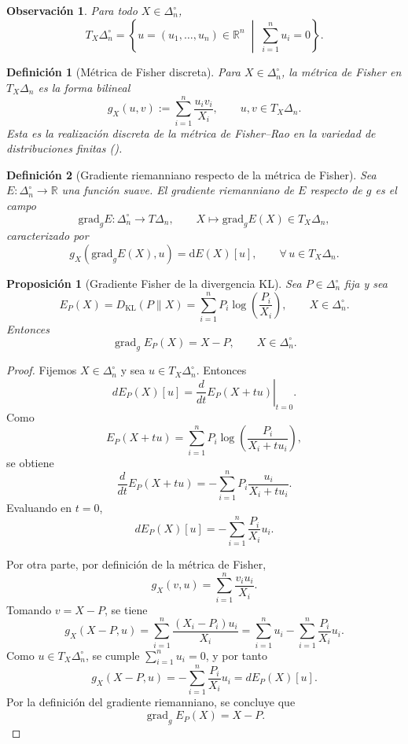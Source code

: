 \documentclass[12pt]{article}
\newtheorem{definicion}{Definición}[section]
\newtheorem{proposicion}{Proposición}[section]
\newtheorem{observacion}{Observación}[section]
\begin{document}
\begin{observacion}
Para todo $X\in\Delta_n^\circ$,
\[
T_X\Delta_n^\circ
=
\left\{
u=(u_1,\dots,u_n)\in\mathbb R^n
\;\middle|\;
\sum_{i=1}^n u_i=0
\right\}.
\]
\end{observacion}

\begin{definicion}[Métrica de Fisher discreta]\label{def:Fisher}
Para $X\in\Delta_n^\circ$, la \emph{métrica de Fisher} en $T_X\Delta_n$ es la forma bilineal
\[
g_X(u,v)
:=
\sum_{i=1}^n \frac{u_i v_i}{X_i},
\qquad
u,v\in T_X\Delta_n.
\]
Esta es la realización discreta de la métrica de Fisher--Rao en la variedad de distribuciones finitas (\cite{Chentsov1982,AmariNagaoka2000,Amari2016}).
\end{definicion}

\begin{definicion}[Gradiente riemanniano respecto de la métrica de Fisher]\label{def:gradienteFisher}
Sea $E:\Delta_n^\circ\to\mathbb R$ una función suave. El \emph{gradiente riemanniano} de $E$ respecto de $g$ es el campo
\[
\mathrm{grad}_gE:\Delta_n^\circ\to T\Delta_n,
\qquad
X\mapsto \mathrm{grad}_gE(X)\in T_X\Delta_n,
\]
caracterizado por
\[
g_X(\mathrm{grad}_gE(X),u)=\mathrm dE(X)[u],
\qquad
\forall\,u\in T_X\Delta_n.
\]
\end{definicion}
\begin{proposicion}[Gradiente Fisher de la divergencia KL]\label{prop:gradKL}
Sea $P\in\Delta_n^\circ$ fija y sea
\[
E_P(X)=D_{\mathrm{KL}}(P\|X)=\sum_{i=1}^n P_i \log\!\left(\frac{P_i}{X_i}\right),
\qquad X\in\Delta_n^\circ.
\]
Entonces
\[
\operatorname{grad}_g E_P(X)=X-P,
\qquad X\in\Delta_n^\circ.
\]
\end{proposicion}

\begin{proof}
Fijemos $X\in\Delta_n^\circ$ y sea $u\in T_X\Delta_n^\circ$. Entonces
\[
dE_P(X)[u]
=
\left.\frac{d}{dt}E_P(X+tu)\right|_{t=0}.
\]
Como
\[
E_P(X+tu)
=
\sum_{i=1}^n P_i \log\!\left(\frac{P_i}{X_i+tu_i}\right),
\]
se obtiene
\[
\frac{d}{dt}E_P(X+tu)
=
-\sum_{i=1}^n P_i \frac{u_i}{X_i+tu_i}.
\]
Evaluando en $t=0$,
\[
dE_P(X)[u]
=
-\sum_{i=1}^n \frac{P_i}{X_i}u_i.
\]

Por otra parte, por definición de la métrica de Fisher,
\[
g_X(v,u)=\sum_{i=1}^n \frac{v_i u_i}{X_i}.
\]
Tomando $v=X-P$, se tiene
\[
g_X(X-P,u)
=
\sum_{i=1}^n \frac{(X_i-P_i)u_i}{X_i}
=
\sum_{i=1}^n u_i - \sum_{i=1}^n \frac{P_i}{X_i}u_i.
\]
Como $u\in T_X\Delta_n^\circ$, se cumple $\sum_{i=1}^n u_i=0$, y por tanto
\[
g_X(X-P,u)
=
-\sum_{i=1}^n \frac{P_i}{X_i}u_i
=
dE_P(X)[u].
\]
Por la definición del gradiente riemanniano, se concluye que
\[
\operatorname{grad}_g E_P(X)=X-P.
\]
\end{proof}
\end{document}
